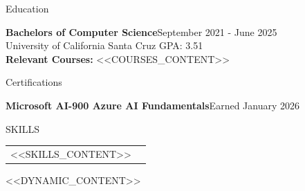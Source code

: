 \documentclass{resume} %
\begin{document}

\begin{rSection}{Education}

{\bf Bachelors of Computer Science}\hfill{September 2021 - June 2025}
\\University of California Santa Cruz \hfill {GPA: 3.51}\\
\textbf{Relevant Courses:} <<COURSES_CONTENT>>




\end{rSection}


\begin{rSection}{Certifications}

{\bf Microsoft AI-900 Azure AI Fundamentals}\hfill{Earned January 2026}





\end{rSection}



\begin{rSection}{SKILLS}
\begin{tabular}{ @{} l l }
<<SKILLS_CONTENT>>
\end{tabular}
\end{rSection}


<<DYNAMIC_CONTENT>>
\end{document}
